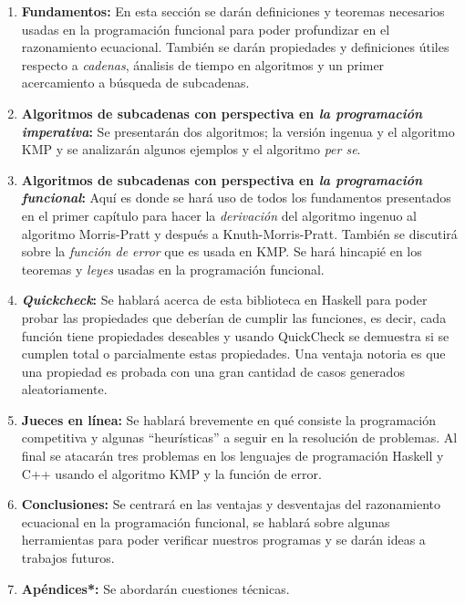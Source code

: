 \documentclass[letterpaper,10pt]{article}
\begin{document}
\begin{enumerate}

\item \textbf{Fundamentos:} En esta sección se darán definiciones y teoremas necesarios usadas en
la programación funcional para poder profundizar en el razonamiento ecuacional. También se darán
propiedades y definiciones útiles respecto a \textit{cadenas}, ánalisis de tiempo en algoritmos y
un primer acercamiento a búsqueda de subcadenas.

\item \textbf{Algoritmos de subcadenas con perspectiva en \textit{la programación imperativa}:} Se
presentarán dos algoritmos; la versión ingenua y el algoritmo KMP y se analizarán algunos ejemplos
y el algoritmo \textit{per se}.

\item \textbf{Algoritmos de subcadenas con perspectiva en \textit{la programación funcional}:}
Aquí es donde se hará uso de todos los fundamentos presentados en el primer capítulo para hacer la
\textit{derivación} del algoritmo ingenuo al algoritmo Morris-Pratt y después a Knuth-Morris-Pratt.
También se discutirá sobre la \textit{función de error} que es usada en KMP. Se hará hincapié en
los teoremas y \textit{leyes} usadas en la programación funcional.

\item \textbf{\textit{Quickcheck}:} Se hablará acerca de esta biblioteca en Haskell para poder
probar las propiedades que deberían de cumplir las funciones, es decir, cada función tiene
propiedades deseables y usando QuickCheck se demuestra si se cumplen total o parcialmente
estas propiedades. Una ventaja notoria es que una propiedad es probada con una gran cantidad de
casos generados aleatoriamente.


\item \textbf{Jueces en línea:} Se hablará brevemente en qué consiste la programación competitiva
y algunas ``heurísticas'' a seguir en la resolución de problemas. Al final se atacarán tres
problemas en los lenguajes de programación Haskell y C++ usando el algoritmo KMP y la función
de error.

\item \textbf{Conclusiones:} Se centrará en las ventajas y desventajas del razonamiento
ecuacional en la programación funcional, se hablará sobre algunas herramientas para poder
verificar nuestros programas y se darán ideas a trabajos futuros.

\item \textbf{Apéndices*:} Se abordarán cuestiones técnicas.

\end{enumerate}
\end{document}
